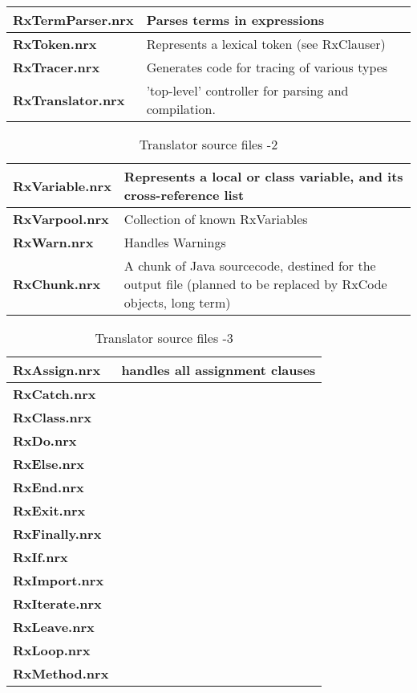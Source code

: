 {\begin{table}
\begin{tabularx}{\textwidth}{>{\bfseries}lX}
\\\midrule
  RxTermParser.nrx    & Parses terms in expressions
\\\midrule
  RxToken.nrx         & Represents a lexical token (see RxClauser)
\\\midrule
  RxTracer.nrx        & Generates code for tracing of various types
\\\midrule
  RxTranslator.nrx    & 'top-level' controller for parsing and
                         compilation.
\\\midrule
\end{tabularx}
\end{table}
\begin{table}\caption{Translator source files -2}
\begin{tabularx}{\textwidth}{>{\bfseries}lX}
\toprule
  RxVariable.nrx      & Represents a local or class variable, and its
                         cross-reference list
\\\midrule
  RxVarpool.nrx       & Collection of known RxVariables
\\\midrule
  RxWarn.nrx          & Handles Warnings
\\\midrule
  RxChunk.nrx         & A chunk of Java sourcecode, destined for the
  output file (planned to be replaced by RxCode objects, long term)
\\\midrule
\end{tabularx}
\end{table}
\begin{table}\caption{Translator source files -3}
\begin{tabularx}{\textwidth}{>{\bfseries}lX}
\toprule
  RxAssign.nrx& handles all assignment clauses
\\\midrule
  RxCatch.nrx       &
\\\midrule
  RxClass.nrx &
\\\midrule
  RxDo.nrx&
\\\midrule
  RxElse.nrx&
\\\midrule
  RxEnd.nrx&
\\\midrule
  RxExit.nrx&
\\\midrule
  RxFinally.nrx&
\\\midrule
  RxIf.nrx&
\\\midrule
  RxImport.nrx&
\\\midrule
  RxIterate.nrx&
\\\midrule
  RxLeave.nrx&
\\\midrule
  RxLoop.nrx&
\\\midrule
  RxMethod.nrx&
\\\midrule

\end{tabularx}
\end{table}}
